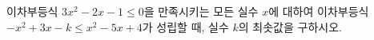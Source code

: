 이차부등식 $3x^2-2x-1\le 0$을 만족시키는 모든 실수 $x$에 대하여 이차부등식 $-x^2+3x-k\le x^2-5x+4$가 성립할 때, 실수 $k$의 최솟값을 구하시오.
